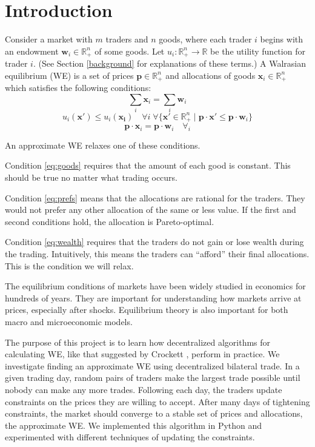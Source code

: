 \documentclass[12pt,a4paper,titlepage]{article}
\begin{document}
\tableofcontents
\newpage

\section{Introduction}
Consider a market with $m$ traders and $n$ goods, where each trader $i$ begins with an endowment $\mathbf{w}_i \in \mathbb{R}^n_+ $ of some goods.
Let $u_i : \mathbb{R}^n_+ \rightarrow \mathbb{R}$ be the utility function for trader $i$.
(See Section \ref{background} for explanations of these terms.)
A Walrasian equilibrium (WE) is a set of prices $\mathbf{p} \in \mathbb{R}^n_+$ and allocations of goods $\mathbf{x}_i \in \mathbb{R}^n_+$ which satisfies the following conditions:
\begin{equation}\label{eq:goods}
  \sum_i \mathbf{x}_i = \sum_i \mathbf{w}_i 
\end{equation}
\begin{equation}\label{eq:prefs}
  u_i(\mathbf{x'}) \leq u_i(\mathbf{x_i}) \quad
  \forall{i} \; \forall{\{\mathbf{x'} \in \mathbb{R}^n_+ \mid \mathbf{p} \cdot \mathbf{x'} \leq \mathbf{p} \cdot \mathbf{w}_i}\}
\end{equation}
\begin{equation}\label{eq:wealth}
  \mathbf{p} \cdot \mathbf{x}_i = \mathbf{p} \cdot \mathbf{w}_i \quad \forall_i 
\end{equation}

An approximate WE relaxes one of these conditions.

Condition \ref{eq:goods} requires that the amount of each good is constant.
This should be true no matter what trading occurs.

Condition \ref{eq:prefs} means that the allocations are rational for the traders.
They would not prefer any other allocation of the same or less value.
If the first and second conditions hold, the allocation is Pareto-optimal.

Condition \ref{eq:wealth} requires that the traders do not gain or lose wealth during the trading.
Intuitively, this means the traders can ``afford'' their final allocations.
This is the condition we will relax.

The equilibrium conditions of markets have been widely studied in economics for hundreds of years.
They are important for understanding how markets arrive at prices, especially after shocks.
Equilibrium theory is also important for both macro and microeconomic models. 

The purpose of this project is to learn how decentralized algorithms for calculating WE, like that suggested by Crockett \cite{crockett}, perform in practice.
We investigate finding an approximate WE using decentralized bilateral trade.
In a given trading day, random pairs of traders make the largest trade possible until nobody can make any more trades. 
Following each day, the traders update constraints on the prices they are willing to accept.
After many days of tightening constraints, the market should converge to a stable set of prices and allocations, the approximate WE.
We implemented this algorithm in Python and experimented with different techniques of updating the constraints.
\end{document}
